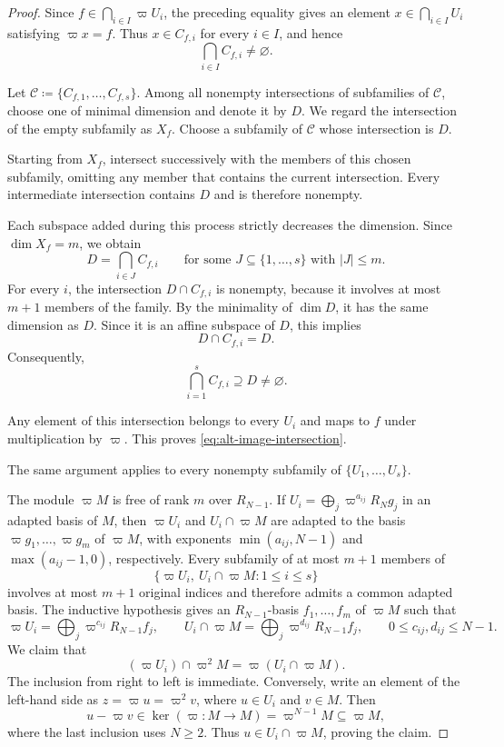 \documentclass[12pt]{amsart}
\theoremstyle{definition}
\theoremstyle{remark}
\begin{document}
\begin{proof}
Since $f\in\bigcap_{i\in I}\varpi U_i$, the preceding equality gives an element
$x\in\bigcap_{i\in I}U_i$ satisfying $\varpi x=f$. Thus $x\in C_{f,i}$ for every $i\in I$, and hence
\[
  \bigcap_{i\in I}C_{f,i}\neq\varnothing.
\]

Let $\mathcal C\coloneqq\{C_{f,1},\ldots,C_{f,s}\}$. Among all nonempty intersections of subfamilies of $\mathcal C$, choose one of minimal dimension and denote it by $D$. We regard the intersection of the empty subfamily as $X_f$. Choose a subfamily of $\mathcal C$ whose intersection is $D$.



Starting from $X_f$, intersect successively with the
members of this chosen subfamily, omitting any member that contains the current intersection. Every intermediate intersection contains $D$ and is therefore nonempty. 


Each subspace added during this process strictly decreases the dimension.  Since $\dim X_f=m$, we obtain
\[
  D=\bigcap_{i\in J}C_{f,i}
  \qquad\text{for some }J\subseteq\{1,\ldots,s\}
  \text{ with }|J|\leq m.
\]
For every $i$, the intersection $D\cap C_{f,i}$ is nonempty, because it involves at most $m+1$ members of the family.
By the minimality of $\dim D$, it has the same
dimension as $D$. Since it is an affine subspace of $D$, this implies
\[
  D\cap C_{f,i}=D.
\]
Consequently,
\[
  \bigcap_{i=1}^s C_{f,i}\supseteq D\neq\varnothing.
\]


Any element of this intersection belongs to every $U_i$ and maps to $f$ under multiplication by $\varpi$. This proves \eqref{eq:alt-image-intersection}.

The same argument applies to every nonempty subfamily of $\{U_1,\ldots,U_s\}$.




The module $\varpi M$ is free of rank $m$ over $R_{N-1}$.
If $U_i=\bigoplus_j\varpi^{a_{ij}}R_Ng_j$ in an adapted
basis of $M$, then $\varpi U_i$ and $U_i\cap\varpi M$
are adapted to the basis $\varpi g_1,\ldots,\varpi g_m$
of $\varpi M$, with exponents $\min(a_{ij},N-1)$ and
$\max(a_{ij}-1,0)$, respectively.
Every subfamily of at most $m+1$ members of
\[
  \{\varpi U_i,\ U_i\cap\varpi M:1\leq i\leq s\}
\]
involves at most $m+1$ original indices and therefore admits
a common adapted basis. The inductive hypothesis gives an
$R_{N-1}$-basis $f_1,\ldots,f_m$ of $\varpi M$ such that
\[
  \varpi U_i=\bigoplus_j\varpi^{c_{ij}}R_{N-1}f_j,
  \qquad
  U_i\cap\varpi M=\bigoplus_j\varpi^{d_{ij}}R_{N-1}f_j,
  \qquad 0\leq c_{ij},d_{ij}\leq N-1.
\]
We claim that
\[
  (\varpi U_i)\cap\varpi^2M
  =\varpi(U_i\cap\varpi M).
\]
The inclusion from right to left is immediate.
Conversely, write an element of the left-hand side as
$z=\varpi u=\varpi^2v$, where $u\in U_i$ and $v\in M$.
Then
\[
  u-\varpi v\in\ker(\varpi:M\to M)
  =\varpi^{N-1}M\subseteq\varpi M,
\]
where the last inclusion uses $N\geq2$.
Thus $u\in U_i\cap\varpi M$, proving the claim.


\end{proof}
\end{document}
